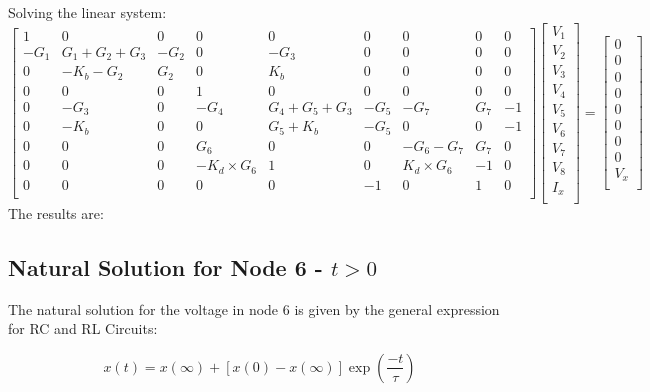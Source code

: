 Solving the linear system:
$$
\begin{bmatrix}
1  &  0 & 0 & 0 & 0 & 0 & 0 & 0 &0      \\
-G_1 & G_1+G_2+G_3 & -G_2 & 0 & -G_3 & 0 & 0 & 0   &0   \\
0 & -K_b-G_2 & G_2 & 0 & K_b & 0 & 0 & 0&0\\
0 & 0 & 0  & 1 & 0 & 0 & 0 & 0  &0    \\
0 & -G_3 & 0 & -G_4 & G_4+G_5+G_3 & -G_5 & -G_7 & G_7 & -1\\
0 & -K_b & 0 & 0 & G_5+K_b & -G_5 & 0 & 0 & -1\\
0 & 0& 0 & G_6 & 0 & 0 & -G_6-G_7 & G_7& 0\\
0 & 0 & 0 & -K_d\times G_6 & 1 & 0 & K_d\times G_6 & -1& 0\\
0 & 0 & 0 & 0 & 0 & -1 & 0 & 1 & 0\\
\end{bmatrix}
\begin{bmatrix}
V_1     \\
V_2    \\
V_3   \\
V_4     \\
V_5     \\
V_6     \\
V_7     \\
V_8     \\
I_x     \\
\end{bmatrix}
=
\begin{bmatrix}
0   \\
0    \\
0  \\
0  \\
0  \\
0  \\
0  \\
0  \\
V_x \\
\end{bmatrix}
\quad
$$
\newpage
The results are:


\subsection{Natural Solution for Node 6 - $t>0$}

The natural solution for the voltage in node 6 is given by the general expression for RC and RL Circuits:

\begin{equation}
    x(t)=x(\infty) + [x(0)-x(\infty)]\exp(\frac{-t}{\tau})
\end{equation}

